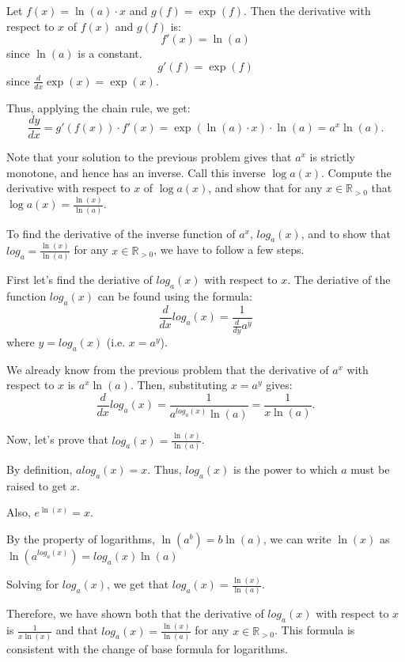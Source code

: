 \documentclass[answers]{exam}
\theoremstyle{remark}
\theoremstyle{definition}
\newcommand{\RR}{\mathbb{R}}
\begin{document}
\begin{questions}
\begin{solution}
Let $f(x) = \ln(a) \cdot x$ and $g(f) = \exp(f)$.
Then the derivative with respect to $x$ of $f(x)$ and $g(f)$ is:
\[f'(x) = \ln(a)\]
since $\ln(a)$ is a constant.
\[g'(f) = \exp(f)\]
since $\frac{d}{dx} \exp(x) = \exp(x)$.

Thus, applying the chain rule, we get:
\[\frac{dy}{dx} = g'(f(x)) \cdot f'(x) = \exp(\ln(a) \cdot x) \cdot \ln(a) = a^x \ln(a).\]

\end{solution}


\question[4] Note that your solution to the previous problem gives that $a^x$ is strictly monotone, and hence has an inverse. Call this inverse $\log{a}(x)$. Compute the derivative with respect to $x$ of $\log{a}(x)$, and show that for any $x \in \RR_{>0}$ that $\log{a}(x)=\frac{\ln(x)}{\ln(a)}$.

\begin{solution}

To find the derivative of the inverse function of $a^x$, $log_a(x)$, and to show that
$log_a = \frac{\ln(x)}{\ln(a)}$ for any $x \in \RR_{>0}$, we have to follow a few steps.

First let's find the deriative of $log_a(x)$ with respect to $x$.
The deriative of the function $log_a(x)$ can be found using the formula:
\[\frac{d}{dx} log_a(x) = \frac{1}{\frac{d}{dy} a^y}\]
where $y = log_a(x)$ (i.e. $x = a^y$).

We already know from the previous problem that the derivative of $a^x$ with respect
to $x$ is $a^x \ln(a)$. Then, substituting $x = a^y$ gives:
\[\frac{d}{dx} log_a(x) = \frac{1}{a^{log_a(x)} \ln(a)} = \frac{1}{x \ln(a)}.\]


Now, let's prove that $log_a(x) = \frac{\ln(x)}{\ln(a)}$.

By definition, $a{log_a(x)} = x$. Thus, $log_a(x)$ is the power to which $a$
must be raised to get $x$.

Also, $e^{\ln(x)} = x$.

By the property of logarithms, $\ln(a^b) = b \ln(a)$, we can write
$\ln(x)$ as $\ln(a^{log_a(x)}) = log_a(x) \ln(a)$

Solving for $log_a(x)$, we get that $log_a(x) = \frac{\ln(x)}{\ln(a)}$.


Therefore, we have shown both that the derivative of $log_a(x)$ with respect to $x$
is $\frac{1}{x \ln(x)}$ and that $log_a(x) = \frac{\ln(x)}{\ln(a)}$ for any
$x \in \RR_{>0}$. This formula is consistent with the change of base formula for logarithms.

\end{solution}

\end{questions}
\end{document}
